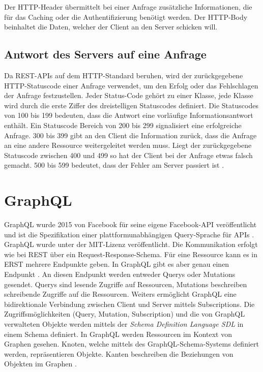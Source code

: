 Der HTTP-Header übermittelt bei einer Anfrage zusätzliche Informationen, die für das Caching oder die Authentifizierung benötigt werden.
Der HTTP-Body beinhaltet die Daten, welcher der Client an den Server schicken will.

\subsection{Antwort des Servers auf eine Anfrage}
Da REST-APIs auf dem HTTP-Standard beruhen, wird der zurückgegebene HTTP-Statuscode einer Anfrage verwendet, um den Erfolg oder das Fehlschlagen der Anfrage festzustellen.
Jeder Status-Code gehört zu einer Klasse, jede Klasse wird durch die erste Ziffer des dreistelligen Statuscodes definiert.
Die Statuscodes von 100 bis 199 bedeuten, dass die Antwort eine vorläufige Informationsantwort enthält.
Ein Statuscode Bereich von 200 bis 299 signalisiert eine erfolgreiche Anfrage.
300 bis 399 gibt an den Client die Information zurück, dass die Anfrage an eine andere Ressource weitergeleitet werden muss.
Liegt der zurückgegebene Statuscode zwischen 400 und 499 so hat der Client bei der Anfrage etwas falsch gemacht.
500 bis 599 bedeutet, dass der Fehler am Server passiert ist \parencite[S. 120]{fielding2000architectural}.

\section{GraphQL}
GraphQL wurde 2015 von Facebook für seine eigene Facebook-API veröffentlicht und ist die Spezifikation einer plattformunabhängigen Query-Sprache für APIs \parencite[S. 18]{kress2020graphql}.
GraphQL wurde unter der MIT-Lizenz veröffentlicht.
Die Kommunikation erfolgt wie bei REST über ein Request-Response-Schema.
Für eine Ressource kann es in ERST mehrere Endpunkte geben.
In GraphQL gibt es aber genau einen Endpunkt \parencite[S. 18]{kress2020graphql}.
An diesen Endpunkt werden entweder Querys oder Mutations gesendet.
Querys sind lesende Zugriffe auf Ressourcen, Mutations beschreiben schreibende Zugriffe auf die Ressourcen.
Weiters ermöglicht GraphQL eine bidirektionale Verbindung zwischen Client und Server mittels Subscriptions.
Die Zugriffsmöglichkeiten (Query, Mutation, Subscription) und die von GraphQL verwalteten Objekte werden mittels der \textit{Schema Definition Language SDL} in einem Schema definiert.
In GraphQL werden Ressourcen im Kontext von Graphen gesehen.
Knoten, welche mittels des GraphQL-Schema-Systems definiert werden, repräsentieren Objekte.
Kanten beschreiben die Beziehungen von Objekten im Graphen \parencite[Abs. Basics of a GraphQL API]{rakutenGraphQLVsRest}.
\newline

